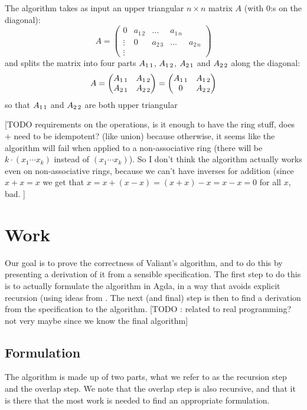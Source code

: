 \documentclass{article}
\begin{document}
The algorithm takes as input an upper triangular $n \times n$ matrix $A$ (with $0$:s on the diagonal): 
\begin{equation}
A = 
\begin{pmatrix}
0 & a_{1\, 2} & \hdots & a_{1\, n} \\
\vdots & 0 & a_{2\,3} &  \hdots & a_{2\,n}\\
\vdots &
\end{pmatrix}
\end{equation}
and splits the matrix into four parts $A_{1\,1}$, $A_{1\,2}$, $A_{2\,1}$ and $A_{2\,2}$ along the diagonal: 
\begin{equation}
A = \begin{pmatrix}
  A_{1\,1} & A_{1\,2} \\
  A_{2\,1} & A_{2\,2}
\end{pmatrix} = \begin{pmatrix}
  A_{1\,1} & A_{1\,2} \\
  0 & A_{2\,2}
\end{pmatrix}
\end{equation}
so that $A_{1\,1}$ and $A_{2\,2}$ are both upper triangular

[TODO requirements on the operations, is it enough to have the ring stuff, does $+$ need to be idempotent? (like union) because otherwise, it seems like the algorithm will fail when applied to a non-associative ring (there will be $k\cdot (x_1\cdots x_k)$ instead of $(x_1\cdots x_k)$). So I don't think the algorithm actually works even on non-associative rings, because we can't have inverses for addition (since $x + x = x$ we get that $x = x + (x - x) = (x + x) - x = x - x = 0$ for all $x$, bad. ]

\section{Work}
Our goal is to prove the correctness of Valiant's algorithm, and to do this by presenting a derivation of it from a sensible specification. The first step to do this is to actually formulate the algorithm in Agda, in a way that avoids explicit recursion (using ideas from \cite{AoP}. The next (and final) step is then to find a derivation from the specification to the algorithm. [TODO : related to real programming? not very maybe since we know the final algorithm]
\subsection{Formulation}
The algorithm is made up of two parts, what we refer to as the recursion step and the overlap step. We note that the overlap step is also recursive, and that it is there that the most work is needed to find an appropriate formulation.
\end{document}
